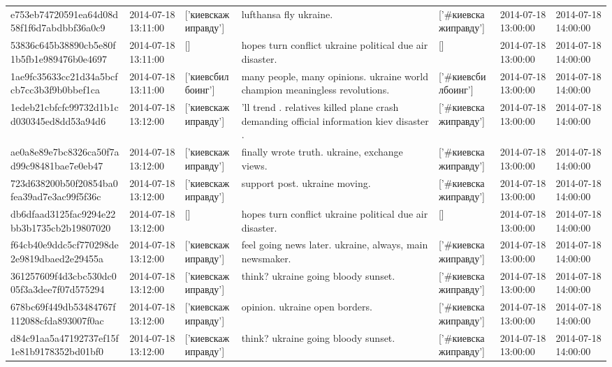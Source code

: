 \begin{tabular}{lllllll}
e753eb74720591ea64d08d58f1f6d7abdbbf36a0c9 & 2014-07-18 13:11:00 & ['киевскажиправду'] & lufthansa fly ukraine. & ['#киевскажиправду'] & 2014-07-18 13:00:00 & 2014-07-18 14:00:00 \\
53836c645b38890cb5e80f1b5fb1e989476b0e4697 & 2014-07-18 13:11:00 & [] & hopes turn conflict ukraine political due air disaster. & [] & 2014-07-18 13:00:00 & 2014-07-18 14:00:00 \\
1ae9fc35633cc21d34a5bcfcb7cc3b3f9b0bbef1ca & 2014-07-18 13:11:00 & ['киевсбилбоинг'] & many people, many opinions. ukraine world champion meaningless revolutions. & ['#киевсбилбоинг'] & 2014-07-18 13:00:00 & 2014-07-18 14:00:00 \\
1edeb21cbfcfc99732d1b1cd030345ed8dd53a94d6 & 2014-07-18 13:12:00 & ['киевскажиправду'] & 'll trend . relatives killed plane crash demanding official information kiev disaster . & ['#киевскажиправду'] & 2014-07-18 13:00:00 & 2014-07-18 14:00:00 \\
ae0a8e89e7bc8326ca50f7ad99c98481bae7e0eb47 & 2014-07-18 13:12:00 & ['киевскажиправду'] & finally wrote truth. ukraine, exchange views. & ['#киевскажиправду'] & 2014-07-18 13:00:00 & 2014-07-18 14:00:00 \\
723d638200b50f20854ba0fea39ad7e3ac99f5f36c & 2014-07-18 13:12:00 & ['киевскажиправду'] & support post. ukraine moving. & ['#киевскажиправду'] & 2014-07-18 13:00:00 & 2014-07-18 14:00:00 \\
db6dfaad3125fac9294e22bb3b1735cb2b19807020 & 2014-07-18 13:12:00 & [] & hopes turn conflict ukraine political due air disaster. & [] & 2014-07-18 13:00:00 & 2014-07-18 14:00:00 \\
f64cb40e9ddc5cf770298de2e9819dbaed2e29455a & 2014-07-18 13:12:00 & ['киевскажиправду'] & feel going news later. ukraine, always, main newsmaker. & ['#киевскажиправду'] & 2014-07-18 13:00:00 & 2014-07-18 14:00:00 \\
361257609f4d3cbc530dc005f3a3dee7f07d575294 & 2014-07-18 13:12:00 & ['киевскажиправду'] & think? ukraine going bloody sunset. & ['#киевскажиправду'] & 2014-07-18 13:00:00 & 2014-07-18 14:00:00 \\
678bc69f449db53484767f112088cfda893007f0ac & 2014-07-18 13:12:00 & ['киевскажиправду'] & opinion. ukraine open borders. & ['#киевскажиправду'] & 2014-07-18 13:00:00 & 2014-07-18 14:00:00 \\
d84c91aa5a47192737ef15f1e81b9178352bd01bf0 & 2014-07-18 13:12:00 & ['киевскажиправду'] & think? ukraine going bloody sunset. & ['#киевскажиправду'] & 2014-07-18 13:00:00 & 2014-07-18 14:00:00 \\

\end{tabular}
